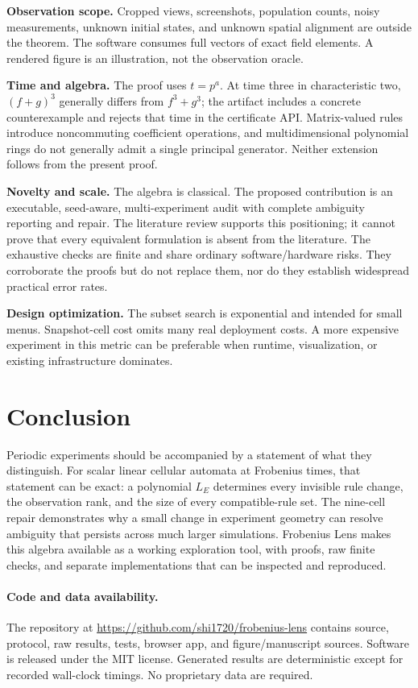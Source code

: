 \documentclass{ijuc}
\begin{document}
\textbf{Observation scope.} Cropped views, screenshots, population counts, noisy measurements, unknown initial states, and unknown spatial alignment are outside the theorem. The software consumes full vectors of exact field elements. A rendered figure is an illustration, not the observation oracle.

\textbf{Time and algebra.} The proof uses $t=p^a$. At time three in characteristic two, $(f+g)^3$ generally differs from $f^3+g^3$; the artifact includes a concrete counterexample and rejects that time in the certificate API. Matrix-valued rules introduce noncommuting coefficient operations, and multidimensional polynomial rings do not generally admit a single principal generator. Neither extension follows from the present proof.

\textbf{Novelty and scale.} The algebra is classical. The proposed contribution is an executable, seed-aware, multi-experiment audit with complete ambiguity reporting and repair. The literature review supports this positioning; it cannot prove that every equivalent formulation is absent from the literature. The exhaustive checks are finite and share ordinary software/hardware risks. They corroborate the proofs but do not replace them, nor do they establish widespread practical error rates.

\textbf{Design optimization.} The subset search is exponential and intended for small menus. Snapshot-cell cost omits many real deployment costs. A more expensive experiment in this metric can be preferable when runtime, visualization, or existing infrastructure dominates.

\section{Conclusion}
Periodic experiments should be accompanied by a statement of what they distinguish. For scalar linear cellular automata at Frobenius times, that statement can be exact: a polynomial $L_E$ determines every invisible rule change, the observation rank, and the size of every compatible-rule set. The nine-cell repair demonstrates why a small change in experiment geometry can resolve ambiguity that persists across much larger simulations. Frobenius Lens makes this algebra available as a working exploration tool, with proofs, raw finite checks, and separate implementations that can be inspected and reproduced.

\paragraph{Code and data availability.}
The repository at \url{https://github.com/shi1720/frobenius-lens} contains source, protocol, raw results, tests, browser app, and figure/manuscript sources. Software is released under the MIT license. Generated results are deterministic except for recorded wall-clock timings. No proprietary data are required.
\end{document}
